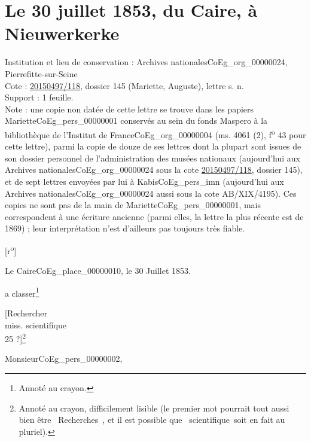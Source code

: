 \documentclass{book}
\begin{document}
\section*{Le 30 juillet 1853, du Caire, à Nieuwerkerke} \label{CoEg_Mariette_1853-07-30} 
{\footnotesize \noindent Institution et lieu de conservation : Archives nationales\gls{CoEg_org_00000024}, Pierrefitte-sur-Seine\\
Cote : \hyperref[CoEg_Mariette_ms_001]{20150497/118}, dossier 145 (Mariette, Auguste), lettre s. n.\\
Support : 1 feuille.\\
Note : une copie non datée de cette lettre se trouve dans les papiers Mariette\gls{CoEg_pers_00000001} conservés au sein du fonds Maspero à la bibliothèque de l'Institut de France\gls{CoEg_org_00000004} (ms. 4061 (2), f\textsuperscript{o} 43 pour cette lettre), parmi la copie de douze de ses lettres dont la plupart sont issues de son dossier personnel de l'administration des musées nationaux (aujourd'hui aux Archives nationales\gls{CoEg_org_00000024} sous la cote \hyperref[CoEg_Mariette_ms_001]{20150497/118}, dossier 145), et de sept lettres envoyées par lui à Kabis\gls{CoEg_pers_imn} (aujourd'hui aux Archives nationales\gls{CoEg_org_00000024} aussi sous la cote AB/XIX/4195). Ces copies ne sont pas de la main de Mariette\gls{CoEg_pers_00000001}, mais correspondent à une écriture ancienne (parmi elles, la lettre la plus récente est de 1869) ; leur interprétation n'est d'ailleurs pas toujours très fiable.
\begin{center} {[r\textsuperscript{o}]}\end{center}}
\begin{flushright}Le Caire\gls{CoEg_place_00000010}, le 30 Juillet 1853.\end{flushright}
\indent a classer\footnote{Annoté au crayon.}
\begin{flushright}{[Rechercher\\
miss. scientifique\\
25 ?]}\footnote{Annoté au crayon, difficilement lisible (le premier mot pourrait tout aussi bien être \og ~Recherches~\fg, et il est possible que \og ~scientifique~\fg soit en fait au pluriel).}\end{flushright}

\hspace{1cm} Monsieur\gls{CoEg_pers_00000002},\\
\end{document}
